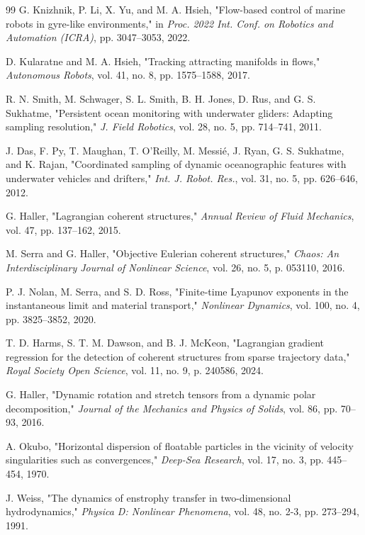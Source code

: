 \documentclass[lettersize,journal]{IEEEtran}
\begin{document}
\begin{thebibliography}{99}
 G. Knizhnik, P. Li, X. Yu, and M. A. Hsieh, "Flow-based control
of marine robots in gyre-like environments," in \textit{Proc. 2022 Int. Conf.
on Robotics and Automation (ICRA)}, pp. 3047--3053, 2022.

 D. Kularatne and M. A. Hsieh, "Tracking attracting manifolds in
flows," \textit{Autonomous Robots}, vol. 41, no. 8, pp. 1575--1588, 2017.

 R. N. Smith, M. Schwager, S. L. Smith, B. H. Jones, D. Rus,
and G. S. Sukhatme, "Persistent ocean monitoring with underwater gliders:
Adapting sampling resolution," \textit{J. Field Robotics}, vol. 28, no. 5,
pp. 714--741, 2011.

 J. Das, F. Py, T. Maughan, T. O'Reilly, M. Messi\'e, J. Ryan,
G. S. Sukhatme, and K. Rajan, "Coordinated sampling of dynamic
oceanographic features with underwater vehicles and drifters,"
\textit{Int. J. Robot. Res.}, vol. 31, no. 5, pp. 626--646, 2012.

 G. Haller, "Lagrangian coherent structures," \textit{Annual
Review of Fluid Mechanics}, vol. 47, pp. 137--162, 2015.

 M. Serra and G. Haller, "Objective Eulerian coherent
structures," \textit{Chaos: An Interdisciplinary Journal of Nonlinear
Science}, vol. 26, no. 5, p. 053110, 2016.

 P. J. Nolan, M. Serra, and S. D. Ross, "Finite-time Lyapunov
exponents in the instantaneous limit and material transport,"
\textit{Nonlinear Dynamics}, vol. 100, no. 4, pp. 3825--3852, 2020.

 T. D. Harms, S. T. M. Dawson, and B. J. McKeon, "Lagrangian
gradient regression for the detection of coherent structures from sparse
trajectory data," \textit{Royal Society Open Science}, vol. 11, no. 9,
p. 240586, 2024.

 G. Haller, "Dynamic rotation and stretch tensors from a
dynamic polar decomposition," \textit{Journal of the Mechanics and Physics
of Solids}, vol. 86, pp. 70--93, 2016.

 A. Okubo, "Horizontal dispersion of floatable particles in the
vicinity of velocity singularities such as convergences," \textit{Deep-Sea
Research}, vol. 17, no. 3, pp. 445--454, 1970.

 J. Weiss, "The dynamics of enstrophy transfer in two-dimensional
hydrodynamics," \textit{Physica D: Nonlinear Phenomena}, vol. 48, no. 2-3,
pp. 273--294, 1991.


\end{thebibliography}
\end{document}
